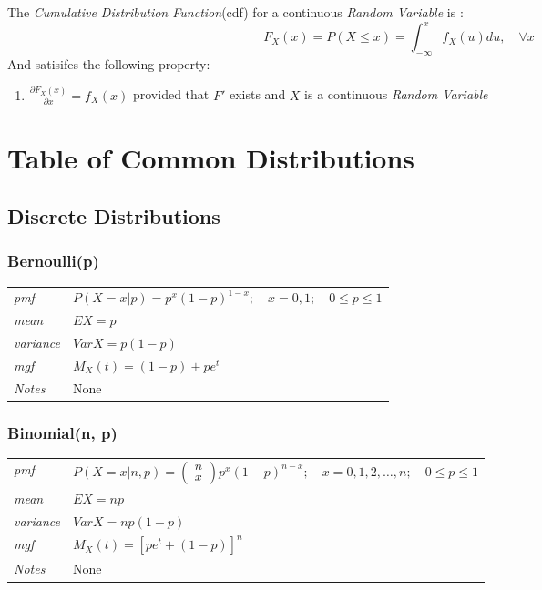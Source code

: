 \documentclass[12pt]{article}
\begin{document}
The \emph{Cumulative Distribution Function}(cdf) for a continuous \emph{Random Variable} is \cite[p.5]{classnotes.4}:
$$F_X(x)=P(X \leq x) = \int_{-\infty}^{x}f_X(u)du, \quad \forall x$$
And satisifes the following property:
\begin{enumerate}
\item $\frac{\partial F_X(x)}{\partial x}=f_X(x)$ provided that $F'$ exists and $X$ is a continuous \emph{Random Variable}
\end{enumerate}

\section*{Table of Common Distributions}
\subsection*{Discrete Distributions}
\subsubsection*{Bernoulli(p) \cite[p. 621]{StatisticalInference}}
\begin{tabularx}{\textwidth}{ l X }
\emph{pmf} & $P(X=x|p)=p^x(1-p)^{1-x}; \quad x=0, 1; \quad 0 \leq p \leq 1$ \\
\emph{mean} & $EX=p$ \\
\emph{variance} & $Var X =p(1-p)$ \\
\emph{mgf} & $M_X(t)=(1-p)+pe^t$ \\
\emph{Notes} & None\\
\end{tabularx}

\subsubsection*{Binomial(n, p) \cite[p. 621]{StatisticalInference}}
\begin{tabularx}{\textwidth}{ l X }
\emph{pmf} & $P(X=x|n, p)=\begin{pmatrix}
n \\
x
\end{pmatrix}p^x(1-p)^{n-x}; \quad x=0, 1, 2, \dots, n; \quad 0 \leq p \leq 1$ \\
\emph{mean} & $EX=np$ \\
\emph{variance} & $Var X =np(1-p)$ \\
\emph{mgf} & $M_X(t)=[pe^t + (1-p)]^n$ \\
\emph{Notes} & None\\
\end{tabularx}
\end{document}
